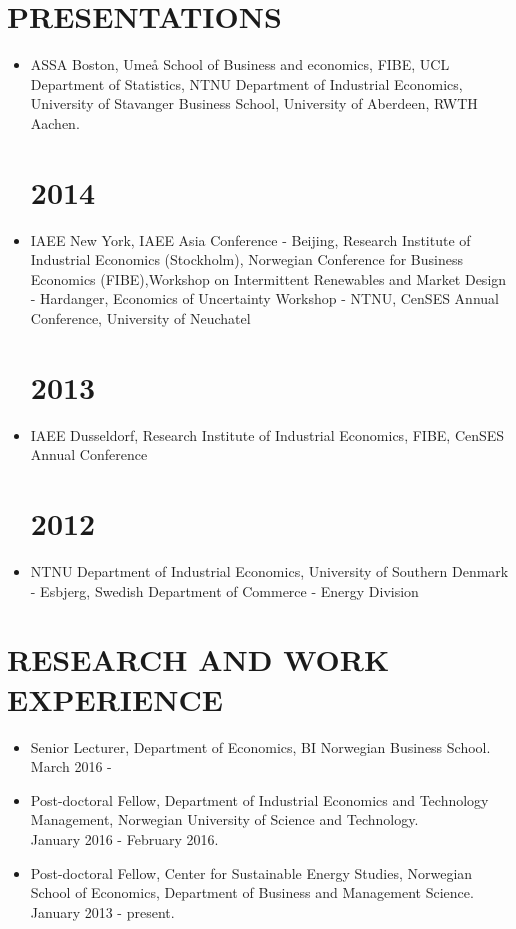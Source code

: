 \documentclass[margin]{res}
\begin{document}
\begin{resume}
\section{PRESENTATIONS}      
 
\begin{itemize}
\normalsize{\section{2015}} 
\item[] ASSA Boston, Ume\r{a} School of Business and economics, FIBE, UCL Department of Statistics, NTNU Department of Industrial Economics, University of Stavanger Business School, University of Aberdeen, RWTH Aachen.
\normalsize{\section{2014}} 
\item[] IAEE New York, IAEE Asia Conference - Beijing, Research Institute of Industrial Economics (Stockholm), Norwegian Conference for Business Economics (FIBE),Workshop on Intermittent Renewables and Market Design - Hardanger, Economics of Uncertainty Workshop - NTNU, CenSES Annual Conference, University of Neuchatel  
\normalsize{\section{2013}}
\item[] IAEE Dusseldorf, Research Institute of Industrial Economics, FIBE, CenSES Annual Conference 
\normalsize{\section{2012}}
\item[] NTNU Department of Industrial Economics, University of Southern Denmark - Esbjerg, Swedish Department of Commerce - Energy Division
\end{itemize}

 
\section{RESEARCH AND WORK EXPERIENCE}      
                  \begin{itemize}
                  \setlength{\itemsep}{10pt}
                  \item[] Senior Lecturer, Department of Economics, BI Norwegian Business School. \\ March 2016 - 
                  \item[] Post-doctoral Fellow, Department of Industrial Economics and Technology Management, Norwegian University of Science and Technology. \\ January 2016 - February 2016. 
                  \item[] Post-doctoral Fellow, Center for Sustainable Energy Studies, Norwegian School of Economics, Department of Business and Management Science. \\ January 2013 - present.


\end{itemize}
\end{resume}
\end{document}
